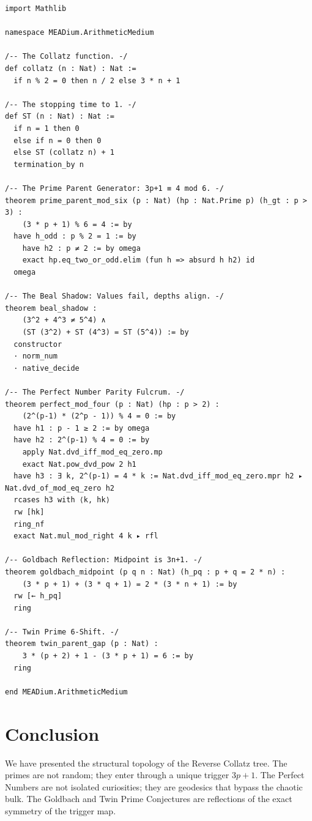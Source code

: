 \documentclass[11pt]{article}
\theoremstyle{definition}
\theoremstyle{remark}
\begin{document}
\begin{lstlisting}[style=lean]
import Mathlib

namespace MEADium.ArithmeticMedium

/-- The Collatz function. -/
def collatz (n : Nat) : Nat :=
  if n % 2 = 0 then n / 2 else 3 * n + 1

/-- The stopping time to 1. -/
def ST (n : Nat) : Nat :=
  if n = 1 then 0 
  else if n = 0 then 0
  else ST (collatz n) + 1
  termination_by n

/-- The Prime Parent Generator: 3p+1 ≡ 4 mod 6. -/
theorem prime_parent_mod_six (p : Nat) (hp : Nat.Prime p) (h_gt : p > 3) :
    (3 * p + 1) % 6 = 4 := by
  have h_odd : p % 2 = 1 := by
    have h2 : p ≠ 2 := by omega
    exact hp.eq_two_or_odd.elim (fun h => absurd h h2) id
  omega

/-- The Beal Shadow: Values fail, depths align. -/
theorem beal_shadow :
    (3^2 + 4^3 ≠ 5^4) ∧
    (ST (3^2) + ST (4^3) = ST (5^4)) := by
  constructor
  · norm_num
  · native_decide

/-- The Perfect Number Parity Fulcrum. -/
theorem perfect_mod_four (p : Nat) (hp : p > 2) :
    (2^(p-1) * (2^p - 1)) % 4 = 0 := by
  have h1 : p - 1 ≥ 2 := by omega
  have h2 : 2^(p-1) % 4 = 0 := by
    apply Nat.dvd_iff_mod_eq_zero.mp
    exact Nat.pow_dvd_pow 2 h1
  have h3 : ∃ k, 2^(p-1) = 4 * k := Nat.dvd_iff_mod_eq_zero.mpr h2 ▸ Nat.dvd_of_mod_eq_zero h2
  rcases h3 with ⟨k, hk⟩
  rw [hk]
  ring_nf
  exact Nat.mul_mod_right 4 k ▸ rfl

/-- Goldbach Reflection: Midpoint is 3n+1. -/
theorem goldbach_midpoint (p q n : Nat) (h_pq : p + q = 2 * n) :
    (3 * p + 1) + (3 * q + 1) = 2 * (3 * n + 1) := by
  rw [← h_pq]
  ring

/-- Twin Prime 6-Shift. -/
theorem twin_parent_gap (p : Nat) :
    3 * (p + 2) + 1 - (3 * p + 1) = 6 := by
  ring

end MEADium.ArithmeticMedium
\end{lstlisting}

\section{Conclusion}

We have presented the structural topology of the Reverse Collatz tree. The primes are not random; they enter through a unique trigger \(3p+1\). The Perfect Numbers are not isolated curiosities; they are geodesics that bypass the chaotic bulk. The Goldbach and Twin Prime Conjectures are reflections of the exact symmetry of the trigger map.
\end{document}
